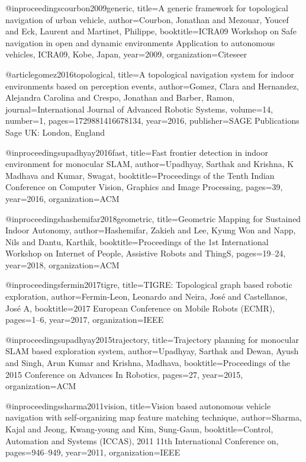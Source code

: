 @inproceedings{courbon2009generic,
  title={A generic framework for topological navigation of urban vehicle},
  author={Courbon, Jonathan and Mezouar, Youcef and Eck, Laurent and Martinet, Philippe},
  booktitle={ICRA09 Workshop on Safe navigation in open and dynamic environments Application to autonomous vehicles, ICRA09, Kobe, Japan},
  year={2009},
  organization={Citeseer}
}

@article{gomez2016topological,
  title={A topological navigation system for indoor environments based on perception events},
  author={Gomez, Clara and Hernandez, Alejandra Carolina and Crespo, Jonathan and Barber, Ramon},
  journal={International Journal of Advanced Robotic Systems},
  volume={14},
  number={1},
  pages={1729881416678134},
  year={2016},
  publisher={SAGE Publications Sage UK: London, England}
}

@inproceedings{upadhyay2016fast,
  title={Fast frontier detection in indoor environment for monocular SLAM},
  author={Upadhyay, Sarthak and Krishna, K Madhava and Kumar, Swagat},
  booktitle={Proceedings of the Tenth Indian Conference on Computer Vision, Graphics and Image Processing},
  pages={39},
  year={2016},
  organization={ACM}
}

@inproceedings{hashemifar2018geometric,
  title={Geometric Mapping for Sustained Indoor Autonomy},
  author={Hashemifar, Zakieh and Lee, Kyung Won and Napp, Nils and Dantu, Karthik},
  booktitle={Proceedings of the 1st International Workshop on Internet of People, Assistive Robots and ThingS},
  pages={19--24},
  year={2018},
  organization={ACM}
}

@inproceedings{fermin2017tigre,
  title={TIGRE: Topological graph based robotic exploration},
  author={Fermin-Leon, Leonardo and Neira, Jos{\'e} and Castellanos, Jos{\'e} A},
  booktitle={2017 European Conference on Mobile Robots (ECMR)},
  pages={1--6},
  year={2017},
  organization={IEEE}
}

@inproceedings{upadhyay2015trajectory,
  title={Trajectory planning for monocular SLAM based exploration system},
  author={Upadhyay, Sarthak and Dewan, Ayush and Singh, Arun Kumar and Krishna, Madhava},
  booktitle={Proceedings of the 2015 Conference on Advances In Robotics},
  pages={27},
  year={2015},
  organization={ACM}
}

@inproceedings{sharma2011vision,
  title={Vision based autonomous vehicle navigation with self-organizing map feature matching technique},
  author={Sharma, Kajal and Jeong, Kwang-young and Kim, Sung-Gaun},
  booktitle={Control, Automation and Systems (ICCAS), 2011 11th International Conference on},
  pages={946--949},
  year={2011},
  organization={IEEE}
}

